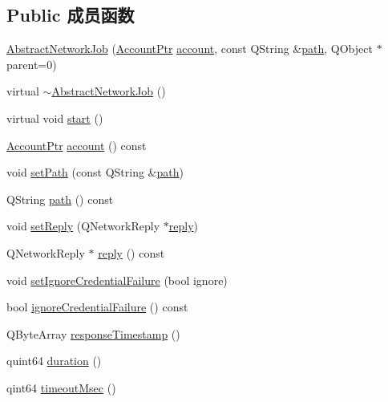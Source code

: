 \subsection*{Public 成员函数}
\begin{DoxyCompactItemize}
\item 
\hyperlink{class_o_c_c_1_1_abstract_network_job_a04e6dd9d09247f2856f9e878bc29cd65}{Abstract\+Network\+Job} (\hyperlink{namespace_o_c_c_a848616aedb9188e223c6b9867757fe69}{Account\+Ptr} \hyperlink{class_o_c_c_1_1_abstract_network_job_a469c9d8212a338ad07d1efa1a94f784d}{account}, const Q\+String \&\hyperlink{class_o_c_c_1_1_abstract_network_job_a8ed2423a454ec861c20f6900f5591ef7}{path}, Q\+Object $\ast$parent=0)
\item 
virtual \hyperlink{class_o_c_c_1_1_abstract_network_job_a7939e5ec97f275539b30998ab5591a2e}{$\sim$\+Abstract\+Network\+Job} ()
\item 
virtual void \hyperlink{class_o_c_c_1_1_abstract_network_job_a256f1b6b5d6f6252e83b3602743da64a}{start} ()
\item 
\hyperlink{namespace_o_c_c_a848616aedb9188e223c6b9867757fe69}{Account\+Ptr} \hyperlink{class_o_c_c_1_1_abstract_network_job_a469c9d8212a338ad07d1efa1a94f784d}{account} () const
\item 
void \hyperlink{class_o_c_c_1_1_abstract_network_job_ace0365f8b9c829bfb7a021810f359cef}{set\+Path} (const Q\+String \&\hyperlink{class_o_c_c_1_1_abstract_network_job_a8ed2423a454ec861c20f6900f5591ef7}{path})
\item 
Q\+String \hyperlink{class_o_c_c_1_1_abstract_network_job_a8ed2423a454ec861c20f6900f5591ef7}{path} () const
\item 
void \hyperlink{class_o_c_c_1_1_abstract_network_job_a3cb752aaa56ecdae68aa5955ff4ee26d}{set\+Reply} (Q\+Network\+Reply $\ast$\hyperlink{class_o_c_c_1_1_abstract_network_job_a38ee84a458ae0792e5bc01e57a59259b}{reply})
\item 
Q\+Network\+Reply $\ast$ \hyperlink{class_o_c_c_1_1_abstract_network_job_a38ee84a458ae0792e5bc01e57a59259b}{reply} () const
\item 
void \hyperlink{class_o_c_c_1_1_abstract_network_job_a710716b5bbc614afdeab868dd4221a8c}{set\+Ignore\+Credential\+Failure} (bool ignore)
\item 
bool \hyperlink{class_o_c_c_1_1_abstract_network_job_a6e48bf66638ad148b7185a24f85ffbd5}{ignore\+Credential\+Failure} () const
\item 
Q\+Byte\+Array \hyperlink{class_o_c_c_1_1_abstract_network_job_a76b4100e0d1ddf7c9d96fd23ba9c6462}{response\+Timestamp} ()
\item 
quint64 \hyperlink{class_o_c_c_1_1_abstract_network_job_a100683873781f0a715e4b34ab7cc8d16}{duration} ()
\item 
qint64 \hyperlink{class_o_c_c_1_1_abstract_network_job_a6ac8f4ffd873d4e26eb5caacaebaeda3}{timeout\+Msec} ()
\end{DoxyCompactItemize}

